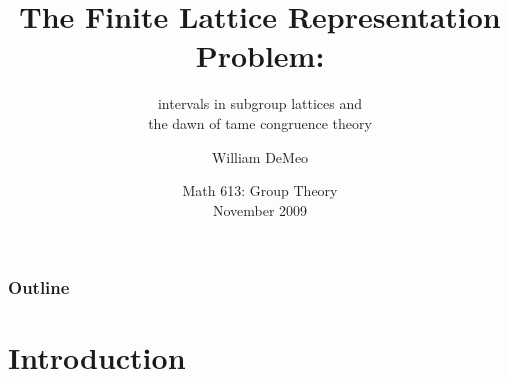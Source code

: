 \documentclass[xcolor=dvipsnames]{beamer}
\title[FLRP] %
{The Finite Lattice Representation Problem:}
\subtitle{intervals in subgroup lattices and \\ the dawn of tame congruence theory}
\author[W.~DeMeo]{William DeMeo}
\institute[University of \Hawaii]{University of \Hawaii\ at \Manoa}
\date[Honolulu 2009]{Math 613: Group Theory\\ November 2009}
\begin{document}

\begin{frame}
  \titlepage
\end{frame}

\begin{frame}
  \frametitle{Outline}
  \tableofcontents
\end{frame}

\section{Introduction}


 
\end{document}
